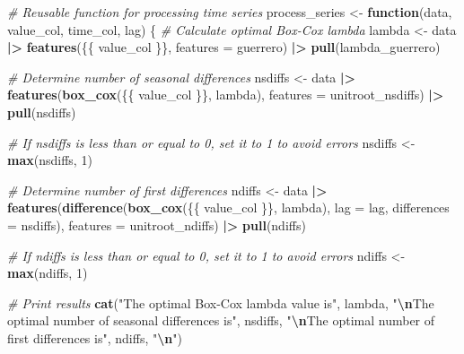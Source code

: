 \documentclass[
]{article}
\newenvironment{Shaded}{\begin{snugshade}}{\end{snugshade}}
\newcommand{\AttributeTok}[1]{\textcolor[rgb]{0.13,0.29,0.53}{#1}}
\newcommand{\CommentTok}[1]{\textcolor[rgb]{0.56,0.35,0.01}{\textit{#1}}}
\newcommand{\ControlFlowTok}[1]{\textcolor[rgb]{0.13,0.29,0.53}{\textbf{#1}}}
\newcommand{\DecValTok}[1]{\textcolor[rgb]{0.00,0.00,0.81}{#1}}
\newcommand{\FunctionTok}[1]{\textcolor[rgb]{0.13,0.29,0.53}{\textbf{#1}}}
\newcommand{\NormalTok}[1]{#1}
\newcommand{\OtherTok}[1]{\textcolor[rgb]{0.56,0.35,0.01}{#1}}
\newcommand{\SpecialCharTok}[1]{\textcolor[rgb]{0.81,0.36,0.00}{\textbf{#1}}}
\newcommand{\StringTok}[1]{\textcolor[rgb]{0.31,0.60,0.02}{#1}}
\begin{document}
\begin{Shaded}
\begin{Highlighting}[]
\CommentTok{\# Reusable function for processing time series}
\NormalTok{process\_series }\OtherTok{\textless{}{-}} \ControlFlowTok{function}\NormalTok{(data, value\_col, time\_col, lag) \{}
  \CommentTok{\# Calculate optimal Box{-}Cox lambda}
\NormalTok{  lambda }\OtherTok{\textless{}{-}}\NormalTok{ data }\SpecialCharTok{|\textgreater{}} 
    \FunctionTok{features}\NormalTok{(\{\{ value\_col \}\}, }\AttributeTok{features =}\NormalTok{ guerrero) }\SpecialCharTok{|\textgreater{}} 
    \FunctionTok{pull}\NormalTok{(lambda\_guerrero)}
  
  \CommentTok{\# Determine number of seasonal differences}
\NormalTok{  nsdiffs }\OtherTok{\textless{}{-}}\NormalTok{ data }\SpecialCharTok{|\textgreater{}} 
    \FunctionTok{features}\NormalTok{(}\FunctionTok{box\_cox}\NormalTok{(\{\{ value\_col \}\}, lambda), }\AttributeTok{features =}\NormalTok{ unitroot\_nsdiffs) }\SpecialCharTok{|\textgreater{}} 
    \FunctionTok{pull}\NormalTok{(nsdiffs)}
  
  \CommentTok{\# If nsdiffs is less than or equal to 0, set it to 1 to avoid errors}
\NormalTok{  nsdiffs }\OtherTok{\textless{}{-}} \FunctionTok{max}\NormalTok{(nsdiffs, }\DecValTok{1}\NormalTok{)}
  
  \CommentTok{\# Determine number of first differences}
\NormalTok{  ndiffs }\OtherTok{\textless{}{-}}\NormalTok{ data }\SpecialCharTok{|\textgreater{}} 
    \FunctionTok{features}\NormalTok{(}\FunctionTok{difference}\NormalTok{(}\FunctionTok{box\_cox}\NormalTok{(\{\{ value\_col \}\}, lambda), }\AttributeTok{lag =}\NormalTok{ lag, }\AttributeTok{differences =}\NormalTok{ nsdiffs), }
             \AttributeTok{features =}\NormalTok{ unitroot\_ndiffs) }\SpecialCharTok{|\textgreater{}} 
    \FunctionTok{pull}\NormalTok{(ndiffs)}
  
  \CommentTok{\# If ndiffs is less than or equal to 0, set it to 1 to avoid errors}
\NormalTok{  ndiffs }\OtherTok{\textless{}{-}} \FunctionTok{max}\NormalTok{(ndiffs, }\DecValTok{1}\NormalTok{)}
  
  \CommentTok{\# Print results}
  \FunctionTok{cat}\NormalTok{(}\StringTok{"The optimal Box{-}Cox lambda value is"}\NormalTok{, lambda,}
      \StringTok{"}\SpecialCharTok{\textbackslash{}n}\StringTok{The optimal number of seasonal differences is"}\NormalTok{, nsdiffs,}
      \StringTok{"}\SpecialCharTok{\textbackslash{}n}\StringTok{The optimal number of first differences is"}\NormalTok{, ndiffs, }\StringTok{"}\SpecialCharTok{\textbackslash{}n}\StringTok{"}\NormalTok{)}
  

\end{Highlighting}
\end{Shaded}
\end{document}
